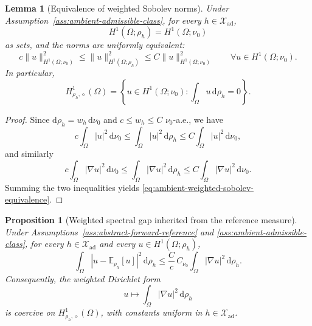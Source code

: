 \documentclass{article}
\newtheorem{lemma}[theorem]{Lemma}
\newtheorem{proposition}[theorem]{Proposition}
\theoremstyle{definition}
\renewcommand{\d}{\mathrm{d}}
\begin{document}
\begin{lemma}[Equivalence of weighted Sobolev norms]
    \label{lem:ambient-weighted-sobolev-equivalence}
    Under Assumption~\ref{ass:ambient-admissible-class}, for every
    \(h\in\mathcal X_{\mathrm{ad}}\),
    \[
        H^1(\Omega;\rho_h)=H^1(\Omega;\nu_0)
    \]
    as sets, and the norms are uniformly equivalent:
    \begin{equation}
        \label{eq:ambient-weighted-sobolev-equivalence}
        c\|u\|_{H^1(\Omega;\nu_0)}^2
        \le
        \|u\|_{H^1(\Omega;\rho_h)}^2
        \le
        C\|u\|_{H^1(\Omega;\nu_0)}^2
        \qquad
        \forall u\in H^1(\Omega;\nu_0).
    \end{equation}
    In particular,
    \[
        H^1_{\rho_h,\diamond}(\Omega)
        =
        \left\{
        u\in H^1(\Omega;\nu_0):\int_\Omega u\,\d\rho_h=0
        \right\}.
    \]
\end{lemma}

\begin{proof}
    Since \(\d\rho_h=w_h\,\d\nu_0\) and \(c\le w_h\le C\) \(\nu_0\)-a.e., we have
    \[
        c\int_\Omega |u|^2\,\d\nu_0
        \le
        \int_\Omega |u|^2\,\d\rho_h
        \le
        C\int_\Omega |u|^2\,\d\nu_0,
    \]
    and similarly
    \[
        c\int_\Omega |\nabla u|^2\,\d\nu_0
        \le
        \int_\Omega |\nabla u|^2\,\d\rho_h
        \le
        C\int_\Omega |\nabla u|^2\,\d\nu_0.
    \]
    Summing the two inequalities yields \eqref{eq:ambient-weighted-sobolev-equivalence}.
\end{proof}

\begin{proposition}[Weighted spectral gap inherited from the reference measure]
    \label{prop:ambient-weighted-poincare}
    Under Assumptions~\ref{ass:abstract-forward-reference} and
    \ref{ass:ambient-admissible-class}, for every \(h\in\mathcal X_{\mathrm{ad}}\) and every
    \(u\in H^1(\Omega;\rho_h)\),
    \begin{equation}
        \label{eq:ambient-weighted-poincare}
        \int_\Omega
        \left|u-\mathbb E_{\rho_h}[u]\right|^2\,\d\rho_h
        \le
        \frac{C}{c}\,C_{\nu_0}
        \int_\Omega |\nabla u|^2\,\d\rho_h.
    \end{equation}
    Consequently, the weighted Dirichlet form
    \[
        u\longmapsto \int_\Omega |\nabla u|^2\,\d\rho_h
    \]
    is coercive on \(H^1_{\rho_h,\diamond}(\Omega)\), with constants uniform in
    \(h\in\mathcal X_{\mathrm{ad}}\).
\end{proposition}
\end{document}
